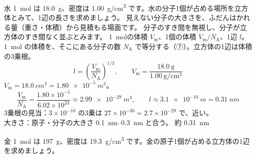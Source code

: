 \label{ph:原-1:ex8}
\begin{phreidai}[水の分子の大きさ]
水 \qty{1}{mol} は \qty{18.0}{g}、密度は \qty{1.00}{g/cm^3} です。水の分子1個が占める場所を立方体とみて、1辺の長さを求めましょう。
\phbamen
見えない分子の大きさを、ふだんはかれる量（重さ・体積）から見積もる場面です。
\phmushi
分子のすき間を無視し、分子が立方体のすき間なく並ぶとみます。
\phzu
\qty{1}{mol}の体積 $V_{\mathrm m}$、1個の体積 $V_{\mathrm m}/N_{\mathrm A}$、1辺 $l$。
\phriyu
\qty{1}{mol} の体積を、そこにある分子の数 $N_{\mathrm A}$ で等分する（⑦）。立方体の1辺は体積の3乗根。
\phtateru
\[ l=\left(\frac{V_{\mathrm m}}{N_{\mathrm A}}\right)^{1/3},\qquad V_{\mathrm m}=\frac{18.0\ \mathrm g}{1.00\ \mathrm{g/cm^3}} \]
\phtoku
$V_{\mathrm m}=\qty{18.0}{cm^3}=\qty{1.80e-5}{m^3}$。
\[ \frac{V_{\mathrm m}}{N_{\mathrm A}}=\frac{1.80\times10^{-5}}{6.02\times10^{23}}\approx\qty{2.99e-29}{m^3},\qquad l\approx\qty{3.1e-10}{m}=\qty{0.31}{nm} \]
\phtashikame
3乗根の見当：$3\times10^{-10}$ の3乗は $27\times10^{-30}=2.7\times10^{-29}$ で、近い。\\
大きさ：原子・分子の大きさ \qtyrange{0.1}{0.3}{nm} と合う。
\kotae 約 \qty{0.31}{nm}
\end{phreidai}
\begin{jibun}
金 \qty{1}{mol} は \qty{197}{g}、密度は \qty{19.3}{g/cm^3} です。金の原子1個が占める立方体の1辺を求めましょう。
\end{jibun}

